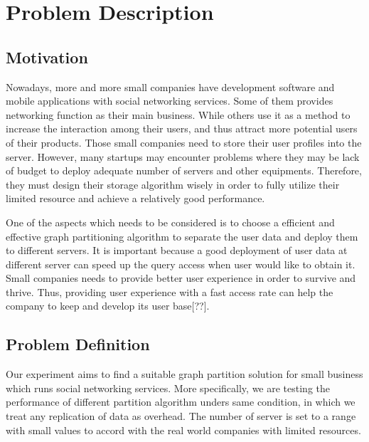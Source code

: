 \section{Problem Description}


\subsection{Motivation}

Nowadays, more and more small companies have development software and mobile applications with social networking services. Some of them provides networking function as their main business. While others use it as a method to increase the interaction among their users, and thus attract more potential users of their products. Those small companies need to store their user profiles into the server. However, many startups may encounter problems where they may be lack of budget to deploy adequate number of servers and other equipments. Therefore, they must design their storage algorithm wisely in order to fully utilize their limited resource and achieve a relatively good performance. 

One of the aspects which needs to be considered is to choose a efficient and effective graph partitioning algorithm to separate the user data and deploy them to different servers. It is important because a good deployment of user data at different server can speed up the query access when user would like to obtain it. Small companies needs to provide better user experience in order to survive and thrive. Thus, providing user experience with a fast access rate can help the company to keep and develop its user base[??].  

\subsection{Problem Definition}

Our experiment aims to find a suitable graph partition solution for small business which runs social networking services. More specifically, we are testing the performance of different partition algorithm unders same condition, in which we treat any replication of data as overhead. The number of server is set to a range with small values to accord with the real world companies with limited resources. 
